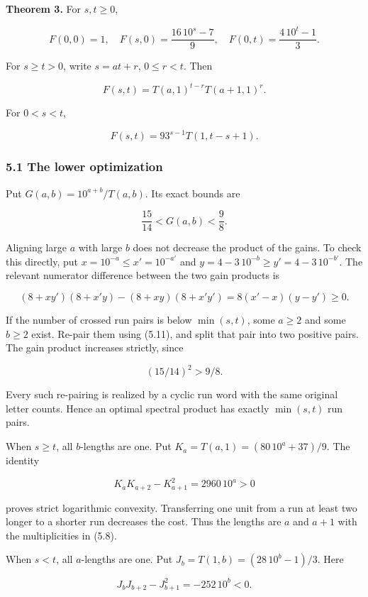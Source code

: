 \textbf{Theorem 3.} For \(s,t\ge0\),

\[
F(0,0)=1,\quad
F(s,0)=\frac{16\,10^s-7}{9},\quad
F(0,t)=\frac{4\,10^t-1}{3}.
\tag{5.7}
\]

For \(s\ge t>0\), write \(s=at+r\), \(0\le r<t\). Then

\[
\boxed{F(s,t)=T(a,1)^{t-r}T(a+1,1)^r.}
\tag{5.8}
\]

For \(0<s<t\),

\[
\boxed{F(s,t)=93^{s-1}T(1,t-s+1).}
\tag{5.9}
\]

\subsubsection{5.1 The lower optimization}\label{the-lower-optimization}

Put \(G(a,b)=10^{a+b}/T(a,b)\). Its exact bounds are

\[
\frac{15}{14}<G(a,b)<\frac98.
\tag{5.10}
\]

Aligning large \(a\) with large \(b\) does not decrease the product of the gains. To check this directly, put \(x=10^{-a}\le x'=10^{-a'}\) and \(y=4-3\,10^{-b}\ge y'=4-3\,10^{-b'}\). The relevant numerator difference between the two gain products is

\[
(8+xy')(8+x'y)-(8+xy)(8+x'y')
=8(x'-x)(y-y')\ge0.
\tag{5.11}
\]

If the number of crossed run pairs is below \(\min(s,t)\), some \(a\ge2\) and some \(b\ge2\) exist. Re-pair them using (5.11), and split that pair into two positive pairs. The gain product increases strictly, since

\[
(15/14)^2>9/8.
\]

Every such re-pairing is realized by a cyclic run word with the same original letter counts. Hence an optimal spectral product has exactly \(\min(s,t)\) run pairs.

When \(s\ge t\), all \(b\)-lengths are one. Put \(K_a=T(a,1)=(80\,10^a+37)/9\). The identity

\[
K_aK_{a+2}-K_{a+1}^2=2960\,10^a>0
\tag{5.12}
\]

proves strict logarithmic convexity. Transferring one unit from a run at least two longer to a shorter run decreases the cost. Thus the lengths are \(a\) and \(a+1\) with the multiplicities in (5.8).

When \(s<t\), all \(a\)-lengths are one. Put \(J_b=T(1,b)=(28\,10^b-1)/3\). Here

\[
J_bJ_{b+2}-J_{b+1}^2=-252\,10^b<0.
\tag{5.13}
\]

